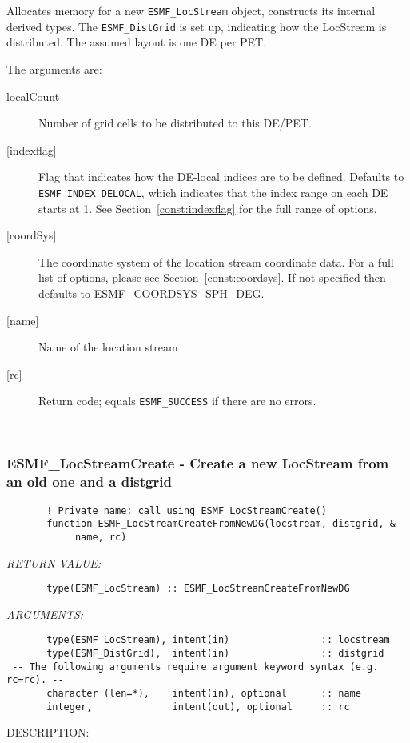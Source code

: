        Allocates memory for a new {\tt ESMF\_LocStream} object, constructs its
       internal derived types.  The {\tt ESMF\_DistGrid} is set up, indicating
       how the LocStream is distributed. The assumed layout is one DE per PET.
  
       The arguments are:
       \begin{description}
       \item[localCount]
            Number of grid cells to be distributed to this DE/PET.
       \item[{[indexflag]}]
            Flag that indicates how the DE-local indices are to be defined.
            Defaults to {\tt ESMF\_INDEX\_DELOCAL}, which indicates
            that the index range on each DE starts at 1. See Section~\ref{const:indexflag}
            for the full range of options. 
       \item[{[coordSys]}]
           The coordinate system of the location stream coordinate data.
           For a full list of options, please see Section~\ref{const:coordsys}.
           If not specified then defaults to ESMF\_COORDSYS\_SPH\_DEG.
       \item[{[name]}]
            Name of the location stream
       \item[{[rc]}]
            Return code; equals {\tt ESMF\_SUCCESS} if there are no errors.
     \end{description}
   
 
\mbox{}\hrulefill\ 
 
\subsubsection [ESMF\_LocStreamCreate] {ESMF\_LocStreamCreate - Create a new LocStream from an old one and a distgrid}


 
\begin{verbatim}       ! Private name: call using ESMF_LocStreamCreate()
       function ESMF_LocStreamCreateFromNewDG(locstream, distgrid, &
            name, rc)
 \end{verbatim}{\em RETURN VALUE:}
\begin{verbatim}       type(ESMF_LocStream) :: ESMF_LocStreamCreateFromNewDG
 \end{verbatim}{\em ARGUMENTS:}
\begin{verbatim}       type(ESMF_LocStream), intent(in)                :: locstream
       type(ESMF_DistGrid),  intent(in)                :: distgrid
 -- The following arguments require argument keyword syntax (e.g. rc=rc). --
       character (len=*),    intent(in), optional      :: name
       integer,              intent(out), optional     :: rc\end{verbatim}
{\sf DESCRIPTION:\\ }


